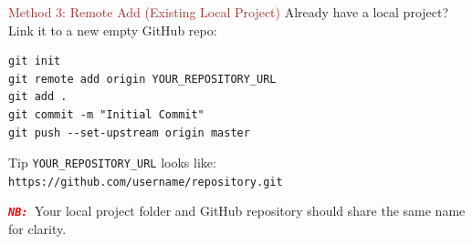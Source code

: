 \begin{frame}[fragile]{\textcolor{brown}{Method 3: Remote Add (Existing Local Project)}}
  Already have a local project? Link it to a new empty GitHub repo:

\begin{lstlisting}[style=gitcode]
git init
git remote add origin YOUR_REPOSITORY_URL
git add .
git commit -m "Initial Commit"
git push --set-upstream origin master
\end{lstlisting}

  \begin{block}{Tip}
    \texttt{YOUR\_REPOSITORY\_URL} looks like:\\
    \texttt{https://github.com/username/repository.git}
  \end{block}

    \emph{\texttt{\textbf{\textcolor{red}{NB: }}}}Your local project folder and GitHub repository should share the same name for clarity.
\end{frame}
